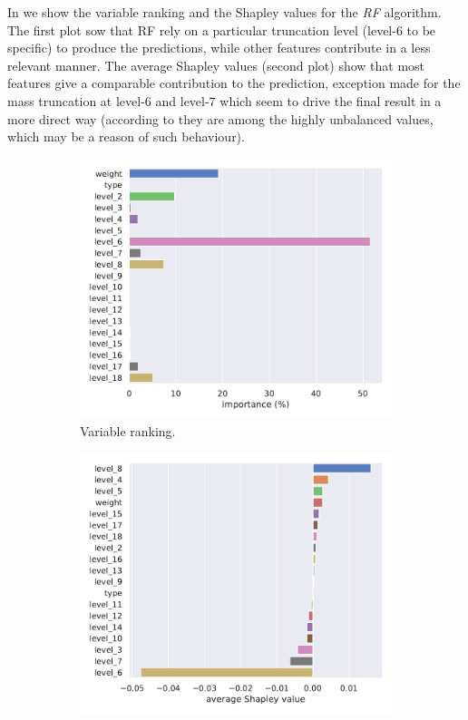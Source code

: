In  we show the variable ranking and the Shapley values for the \emph{RF} algorithm.
The first plot sow that RF rely on a particular truncation level (level-6 to be specific) to produce the predictions, while other features contribute in a less relevant manner.
The average Shapley values (second plot) show that most features give a comparable contribution to the prediction, exception made for the mass truncation at level-6 and level-7 which seem to drive the final result in a more direct way (according to  they are among the highly unbalanced values, which may be a reason of such behaviour).

\begin{figure}[htbp]
  \centering
  \begin{subfigure}{0.45\textwidth}
    \centering
    \includegraphics[width=\linewidth]{img/grd_bst_rank}
    \caption{Variable ranking.}
  \end{subfigure}
  \begin{subfigure}{0.45\textwidth}
    \centering
    \includegraphics[width=\linewidth]{img/grd_bst_shap}

\end{subfigure}
\end{figure}
